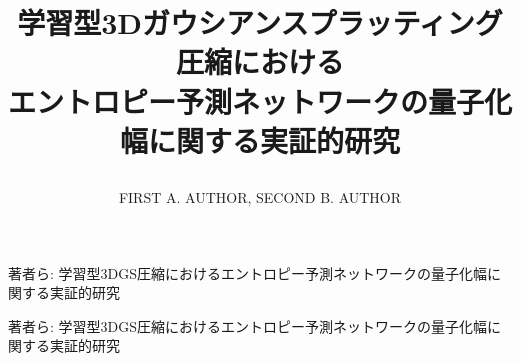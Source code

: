 \documentclass{ieeeaccess}
\begin{document}

\title{\begin{CJK}{UTF8}{min}
学習型3Dガウシアンスプラッティング圧縮における\\
エントロピー予測ネットワークの量子化幅に関する実証的研究
\end{CJK}}

\author{\uppercase{First A. Author},
\uppercase{Second B. Author}}
\address[1]{Affiliation name here (fill in your actual institution and contact e-mail before submission)}

\markboth
{\begin{CJK}{UTF8}{min}著者ら: 学習型3DGS圧縮におけるエントロピー予測ネットワークの量子化幅に関する実証的研究\end{CJK}}
{\begin{CJK}{UTF8}{min}著者ら: 学習型3DGS圧縮におけるエントロピー予測ネットワークの量子化幅に関する実証的研究\end{CJK}}

\end{document}
